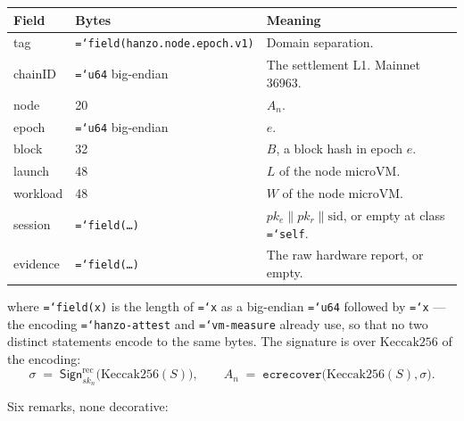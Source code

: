 \documentclass[11pt,a4paper]{article}
\newcommand{\code}[1]{\texttt{\hyphenchar\font=`\-\relax #1}}
\newcommand{\Sign}{\mathsf{Sign}}
\newcommand{\kec}{\mathrm{Keccak256}}
\begin{document}
\begin{center}
\small
\begin{tabular}{@{}llp{}@{}}
\toprule
\textbf{Field} & \textbf{Bytes} & \textbf{Meaning} \\
\midrule
tag        & \code{field(hanzo.node.epoch.v1)} & Domain separation. \\
chainID    & \code{u64} big-endian & The settlement L1. Mainnet 36963. \\
node       & 20 & $A_n$. \\
epoch      & \code{u64} big-endian & $e$. \\
block      & 32 & $B$, a block hash in epoch $e$. \\
launch     & 48 & $L$ of the node microVM. \\
workload   & 48 & $W$ of the node microVM. \\
session    & \code{field(\dots)} & $pk_e \| pk_r \| \mathrm{sid}$, or empty at class \code{self}. \\
evidence   & \code{field(\dots)} & The raw hardware report, or empty. \\
\bottomrule
\end{tabular}
\end{center}

\noindent where \code{field(x)} is the length of \code{x} as a big-endian
\code{u64} followed by \code{x} --- the encoding \code{hanzo-attest} and
\code{vm-measure} already use, so that no two distinct statements encode to the
same bytes. The signature is over $\kec$ of the encoding:
\[
\sigma \;=\; \Sign^{\mathrm{rec}}_{sk_n}\bigl(\kec(S)\bigr), \qquad
A_n \;=\; \mathtt{ecrecover}\bigl(\kec(S), \sigma\bigr).
\]

Six remarks, none decorative:
\end{document}
